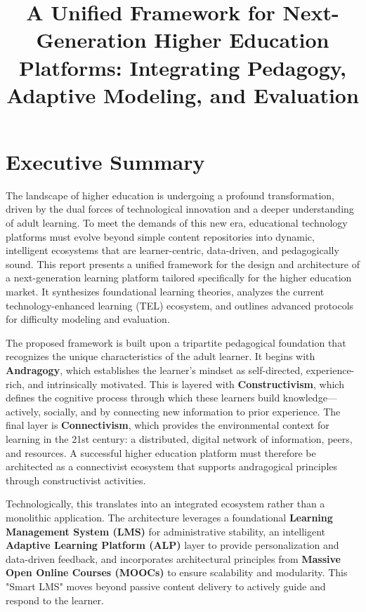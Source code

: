 \documentclass{article}
\title{A Unified Framework for Next-Generation Higher Education Platforms: Integrating Pedagogy, Adaptive Modeling, and Evaluation}
\author{}
\date{}
\begin{document}
\maketitle

\section*{Executive Summary}

The landscape of higher education is undergoing a profound transformation, driven by the dual forces of technological innovation and a deeper understanding of adult learning. To meet the demands of this new era, educational technology platforms must evolve beyond simple content repositories into dynamic, intelligent ecosystems that are learner-centric, data-driven, and pedagogically sound. This report presents a unified framework for the design and architecture of a next-generation learning platform tailored specifically for the higher education market. It synthesizes foundational learning theories, analyzes the current technology-enhanced learning (TEL) ecosystem, and outlines advanced protocols for difficulty modeling and evaluation.

The proposed framework is built upon a tripartite pedagogical foundation that recognizes the unique characteristics of the adult learner. It begins with \textbf{Andragogy}, which establishes the learner's mindset as self-directed, experience-rich, and intrinsically motivated. This is layered with \textbf{Constructivism}, which defines the cognitive process through which these learners build knowledge—actively, socially, and by connecting new information to prior experience. The final layer is \textbf{Connectivism}, which provides the environmental context for learning in the 21st century: a distributed, digital network of information, peers, and resources. A successful higher education platform must therefore be architected as a connectivist ecosystem that supports andragogical principles through constructivist activities.

Technologically, this translates into an integrated ecosystem rather than a monolithic application. The architecture leverages a foundational \textbf{Learning Management System (LMS)} for administrative stability, an intelligent \textbf{Adaptive Learning Platform (ALP)} layer to provide personalization and data-driven feedback, and incorporates architectural principles from \textbf{Massive Open Online Courses (MOOCs)} to ensure scalability and modularity. This "Smart LMS" moves beyond passive content delivery to actively guide and respond to the learner.
\end{document}
